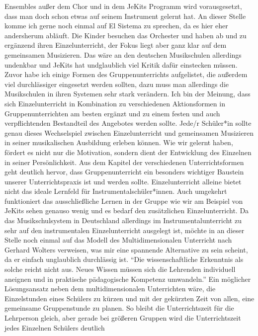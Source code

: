 Ensembles außer dem Chor und in dem JeKits Programm wird vorausgesetzt, dass man
doch schon etwas auf seinem Instrument gelernt hat. An dieser Stelle komme ich
gerne noch einmal auf El Sistema zu sprechen, da es hier eher andersherum
abläuft. Die Kinder besuchen das Orchester und haben ab und zu ergänzend ihren
Einzelunterricht, der Fokus liegt aber ganz klar auf dem gemeinsamen Musizieren. Das wäre an
den deutschen Musikschulen allerdings undenkbar und JeKits hat undglaublich viel
Kritik dafür einstecken müssen. Zuvor habe ich einige Formen des
Gruppenunterrichts aufgelistet, die außerdem viel durchlässiger eingesetzt
werden sollten, dazu muss man allerdings die Musikschulen in ihren Systemen sehr
stark verändern. Ich bin der Meinung, dass sich Einzelunterricht in Kombination
zu verschiedenen Aktionsformen in Gruppenunterrichten am besten ergänzt und zu
einem festen und auch verpflichtenden Bestandteil des Angebotes werden sollte.
Jede/r Schüler*in sollte genau dieses Wechselspiel zwischen Einzelunterricht und
gemeinsamen Musizieren in seiner musikalischen Ausbildung erleben können. Wie
wir gelernt haben, fördert es nicht nur die Motivation, sondern dient der
Entwicklung des Einzelnen in seiner Persönlichkeit. Aus dem Kapitel der
verschiedenen Unterrichtsformen geht deutlich hervor, dass Gruppenunterricht ein
besonders wichtiger Baustein unserer Unterrichtspraxis ist und werden sollte.
Einzelunterricht alleine bietet nicht das ideale Lernfeld für
Instrumentalschüler*innen. Auch umgekehrt funktioniert das ausschließliche
Lernen in der Gruppe wie wir am Beispiel von JeKits sehen genauso wenig und es
bedarf den zusätzlichen Einzelunterricht. Da das Musikschulsystem in Deutschland allerdings im
Instrumentalunterricht zu sehr auf den instrumentalen Einzelunterricht ausgelegt ist, möchte
in an dieser Stelle noch einmal auf das Modell des Multidimensionalen Unterricht
nach Gerhard Wolters verweisen, was mir eine spannende Alternative zu sein
scheint, da er einfach unglaublich durchlässig ist. \enquote{Die
wissenschaftliche Erkenntnis als solche reicht nicht aus. Neues Wissen müssen
sich die Lehrenden individuell aneignen und in praktische pädagogische Kompetenz
umwandeln.} \autocite[10]{losert:die_kunst_zu_unterrichten} Ein möglicher
Lösungsansatz neben dem multidimensionalen Unterrichten wäre, die Einzelstunden
eines Schülers zu kürzen und mit der gekürzten Zeit von allen, eine gemeinsame
Gruppenstunde zu planen. So bleibt die Unterrichtszeit für die Lehrperson
gleich, aber gerade bei größeren Gruppen wird die Unterrichtszeit jedes
Einzelnen Schülers deutlich
